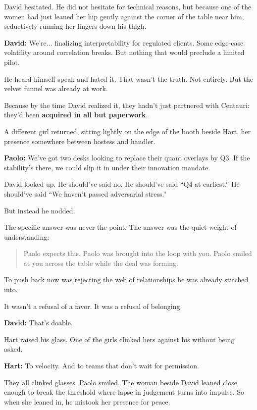 David hesitated. He did not hesitate for technical reasons, but because one of the women had just leaned her hip gently against 
the corner of the table near him, seductively running her fingers down his thigh.

\textbf{David:}  
We’re... finalizing interpretability for regulated clients.  
Some edge-case volatility around correlation breaks.  
But nothing that would preclude a limited pilot.

He heard himself speak and hated it.  
That wasn’t the truth. Not entirely.  
But the velvet funnel was already at work.

Because by the time David realized it, they hadn’t just partnered with Centauri:  
they’d been \textbf{acquired in all but paperwork}.

A different girl returned, sitting lightly on the edge of the booth beside Hart, her presence somewhere between 
hostess and handler.

\textbf{Paolo:}  
We’ve got two desks looking to replace their quant overlays by Q3.  
If the stability’s there, we could slip it in under their innovation mandate.

David looked up.  
He should’ve said no.  
He should’ve said “Q4 at earliest.”  
He should’ve said “We haven’t passed adversarial stress.”

But instead he nodded.

The specific answer was never the point. The answer was the quiet weight of understanding:  

\begin{quote}
  Paolo expects this. Paolo was brought into the loop with you. 
  Paolo smiled at you across the table while the deal 
  was forming.
\end{quote}

To push back now was rejecting the web of relationships he was already stitched into.  

It wasn’t a refusal of a favor.  It was a refusal of belonging.

\textbf{David:}  
That’s doable.

Hart raised his glass. One of the girls clinked hers against his without being asked.

\textbf{Hart:}  
To velocity.  
And to teams that don’t wait for permission.

They all clinked glasses.  
Paolo smiled.  
The woman beside David leaned close enough to break the threshold where lapse in judgement 
turns into impulse. So when she leaned in, he mistook her presence for peace.

